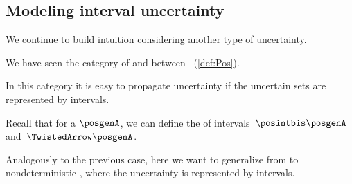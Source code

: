 \subsection{Modeling interval uncertainty}

We continue to build intuition considering another type of uncertainty.

We have seen the category \Pos of  and   between ~(\cref{def:Pos}).

In this category it is easy to propagate uncertainty if the uncertain sets are represented by intervals.

Recall that for a  $\posgenA$, we can define the  of intervals~$\posintbis\posgenA$ and~$\TwistedArrow\posgenA$.

Analogously to the previous case, here we want to generalize from   to nondeterministic  , where the uncertainty is represented by intervals.

